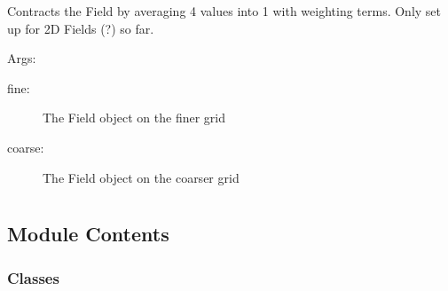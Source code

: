 \documentclass[letterpaper,10pt,english]{sphinxmanual}
\begin{document}
\begin{fulllineitems}
\label{\detokenize{autoapi/Contractinator/index:Contractinator.conservative4way}}
\sphinxAtStartPar
Contracts the Field by averaging 4 values into 1 with weighting terms. Only set up for 2D Fields (?) so far.

\sphinxAtStartPar
Args:
\begin{description}
\item[{fine:}] \leavevmode
\sphinxAtStartPar
The Field object on the finer grid

\item[{coarse:}] \leavevmode
\sphinxAtStartPar
The Field object on the coarser grid

\end{description}

\end{fulllineitems}



\section{}
\label{\detokenize{autoapi/Cycle/index:module-Cycle}}\label{\detokenize{autoapi/Cycle/index:cycle}}\label{\detokenize{autoapi/Cycle/index::doc}}

\subsection{Module Contents}
\label{\detokenize{autoapi/Cycle/index:module-contents}}

\subsubsection{Classes}
\label{\detokenize{autoapi/Cycle/index:classes}}
\end{document}
